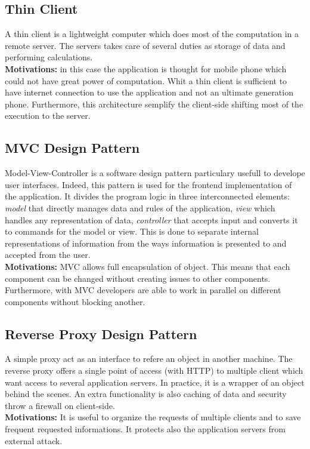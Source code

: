 \documentclass{report}
\begin{document}
\subsection{Thin Client}
A thin client is a lightweight computer which does most of the computation in a remote server. The servers takes care of several duties as storage 
of data and performing calculations.\\
\textbf{Motivations:} in this case the application is thought for mobile phone which could not have great power of computation. Whit 
a thin client is sufficient to have internet connection to use the application and not an ultimate generation phone. Furthermore, 
this architecture semplify the client-side shifting most of the execution to the server.

\subsection{MVC Design Pattern}
Model-View-Controller is a software design pattern particulary usefull to develope user interfaces. Indeed, this pattern is used for the frontend implementation of the application. 
It divides the program logic in three interconnected elements: \textit{model} that directly manages data and rules of the application, \textit{view} which handles any representation of data, \textit{controller} that 
accepts input and converts it to commands for the model or view. This is done to separate internal representations of information 
from the ways information is presented to and accepted from the user. \\
\textbf{Motivations:} MVC allows full encapsulation of object. This means that each component can be changed without creating issues to other components.
Furthermore, with MVC developers are able to work in parallel on different components without blocking another.

\subsection{Reverse Proxy Design Pattern}
A simple proxy act as an interface to refere an object in another machine. The reverse proxy offers a single point of access (with HTTP) 
to multiple client which want access to several application servers. In practice, it is a wrapper of an object behind the scenes. 
An extra functionality is also caching of data and security throw a firewall on client-side.\\
\textbf{Motivations:} It is useful to organize the requests of multiple clients and to save frequent requested informations. 
It protects also the application servers from external attack.
\end{document}
